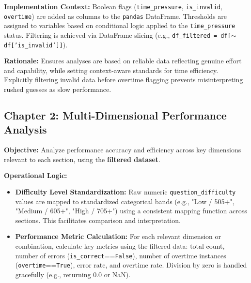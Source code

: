 \documentclass{article}
\begin{document}

\textbf{Implementation Context:} Boolean flags (\texttt{time\_pressure}, \texttt{is\_invalid}, \texttt{overtime}) are added as columns to the \texttt{pandas} DataFrame. Thresholds are assigned to variables based on conditional logic applied to the \texttt{time\_pressure} status. Filtering is achieved via DataFrame slicing (e.g., \texttt{df\_filtered = df[$\sim$df['is\_invalid']]}). %

\textbf{Rationale:} Ensures analyses are based on reliable data reflecting genuine effort and capability, while setting context-aware standards for time efficiency. Explicitly filtering invalid data before overtime flagging prevents misinterpreting rushed guesses as slow performance.

\subsection{Chapter 2: Multi-Dimensional Performance Analysis}

\textbf{Objective:} Analyze performance accuracy and efficiency across key dimensions relevant to each section, using the \textbf{filtered dataset}.

\textbf{Operational Logic:}
\begin{itemize}
    \item \textbf{Difficulty Level Standardization:} Raw numeric \texttt{question\_difficulty} values are mapped to standardized categorical bands (e.g., "Low / 505+", "Medium / 605+", "High / 705+") using a consistent mapping function across sections. This facilitates comparison and interpretation.
    \item \textbf{Performance Metric Calculation:} For each relevant dimension or combination, calculate key metrics using the filtered data: total count, number of errors (\texttt{is\_correct}==\texttt{False}), number of overtime instances (\texttt{overtime}==\texttt{True}), error rate, and overtime rate. Division by zero is handled gracefully (e.g., returning 0.0 or NaN).
\end{itemize}
\end{document}
